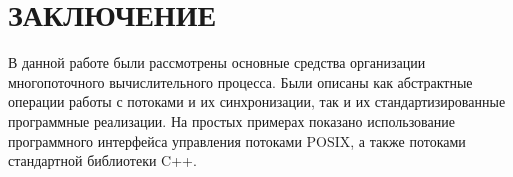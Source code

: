 \section*{ЗАКЛЮЧЕНИЕ}

В данной работе были рассмотрены основные средства организации
многопоточного вычислительного процесса.
Были описаны как абстрактные операции работы с потоками и их синхронизации,
так и их стандартизированные программные реализации.
На простых примерах показано использование программного интерфейса управления
потоками POSIX, а также потоками стандартной библиотеки C++.
